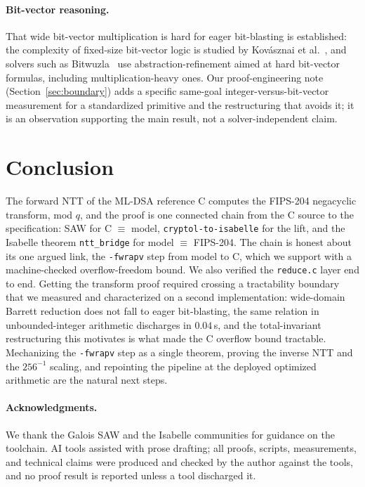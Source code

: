 \documentclass[11pt]{article}
\newcommand{\code}[1]{\texttt{#1}}
\begin{document}
\paragraph{Bit-vector reasoning.} That wide bit-vector multiplication is hard for eager bit-blasting is
established: the complexity of fixed-size bit-vector logic is studied by Kov\'asznai et
al.~\cite{bvcomplexity}, and solvers such as Bitwuzla~\cite{bitwuzla} use abstraction-refinement aimed at
hard bit-vector formulas, including multiplication-heavy ones. Our proof-engineering note (Section~\ref{sec:boundary}) adds a specific same-goal
integer-versus-bit-vector measurement for a standardized primitive and the restructuring that avoids it;
it is an observation supporting the main result, not a solver-independent claim.

\section{Conclusion}\label{sec:conclusion}

The forward NTT of the ML-DSA reference C computes the FIPS-204 negacyclic transform, mod $q$, and the
proof is one connected chain from the C source to the specification: SAW for C $\equiv$ model,
\code{cryptol-to-isabelle} for the lift, and the Isabelle theorem \code{ntt\_bridge} for model $\equiv$
FIPS-204. The chain is honest about its one argued link, the \code{-fwrapv} step from model to C, which
we support with a machine-checked overflow-freedom bound. We also verified the \code{reduce.c} layer end
to end. Getting the transform proof required crossing a tractability boundary that we measured and
characterized on a second implementation: wide-domain Barrett reduction does not fall to eager
bit-blasting, the same relation in unbounded-integer arithmetic discharges in $0.04$\,s, and the
total-invariant restructuring this motivates is what made the C overflow bound tractable. Mechanizing the
\code{-fwrapv} step as a single theorem, proving the inverse NTT and the $256^{-1}$ scaling, and
repointing the pipeline at the deployed optimized arithmetic are the natural next steps.

\paragraph{Acknowledgments.} We thank the Galois SAW and the Isabelle communities for guidance on the
toolchain. AI tools assisted with prose drafting; all proofs, scripts, measurements, and technical claims
were produced and checked by the author against the tools, and no proof result is reported unless a tool
discharged it.
\end{document}
